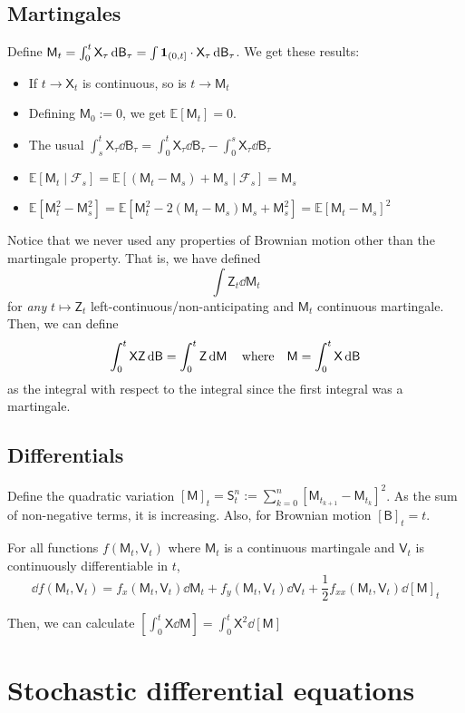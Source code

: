 \documentclass[notes]{agony}
\newcommand{\E}{\mathbb{E}}
\newcommand{\rv}{\mathsf}
\newcommand{\B}{\rv{B}}
\newcommand{\X}{\rv{X}}
\newcommand{\M}{\rv{M}}
\begin{document}
\section{Martingales}

Define $\M_t = \int_0^t \X_\tau\dd{\B_\tau}
	= \int \vb 1_{(0,t]}\cdot\X_\tau\dd{\B_\tau}$.
We get these results:
\begin{itemize}
	\item If $t \to \X_t$ is continuous, so is $t \to \M_t$
	\item Defining $\M_0 := 0$, we get $\E[\M_t] = 0$.
	\item The usual $\int_s^t \X_\tau\dd{\B_\tau} =
		      \int_0^t \X_\tau\dd{\B_\tau} - \int_0^s \X_\tau\dd{\B_\tau}$
	\item $\E[\M_t\mid \mathcal F_s] = \E[(\M_t-\M_s)+\M_s\mid \mathcal F_s] = \M_s$
	\item $\E[\M_t^2 - \M_s^2] = \E[\M_t^2 - 2(\M_t-\M_s)\M_s + \M_s^2] = \E[\M_t-\M_s]^2$
\end{itemize}

Notice that we never used any properties of Brownian motion other than the
martingale property. That is, we have defined
\[ \int \rv Z_t \dd{\M_t} \]
for \emph{any} $t \mapsto \rv Z_t$ left-continuous/non-anticipating
and $\M_t$ continuous martingale. Then, we can define
\[ \int_0^t \X \rv Z \dd{\B} = \int_0^t \rv Z \dd{\M} \qq{where} \M = \int_0^t \X \dd{\B} \]
as the integral with respect to the integral since the first integral was a martingale.

\section{Differentials}

Define the quadratic variation
$[\M]_t = \rv S_t^n := \sum_{k=0}^n [\M_{t_{k+1}} - \M_{t_k}]^2$.
As the sum of non-negative terms, it is increasing.
Also, for Brownian motion $[\B]_t = t$.

\begin{theorem}
	For all functions $f(\M_t,\rv V_t)$ where $\M_t$ is a continuous martingale
	and $\rv V_t$ is continuously differentiable in $t$,
	\[
		\dd{f(\M_t,\rv V_t)} = f_x(\M_t,\rv V_t)\dd{\M_t} + f_y(\M_t,\rv V_t)\dd{\rv V_t} + \frac12 f_{xx}(\M_t,\rv V_t)\dd{[\M]_t}
	\]
\end{theorem}
Then, we can calculate $[\int_0^t\X\dd{\M}] = \int_0^t \X^2\dd{[\M]}$

\chapter{Stochastic differential equations}
\end{document}
